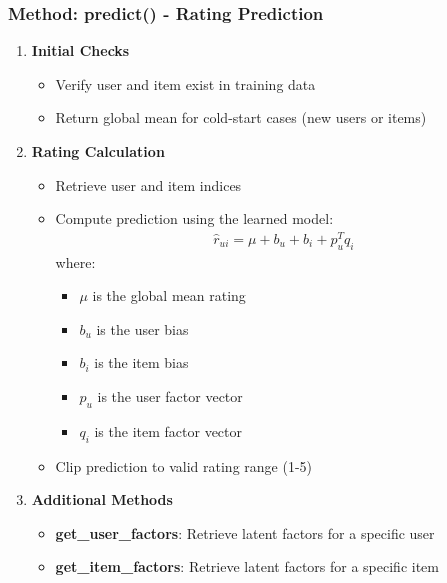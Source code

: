 \documentclass{beamer}
\begin{document}
\begin{frame}
\frametitle{Method: predict() - Rating Prediction}

\begin{enumerate}
    \item \textbf{Initial Checks}
    \begin{itemize}
        \item Verify user and item exist in training data
        \item Return global mean for cold-start cases (new users or items)
    \end{itemize}
    
    \item \textbf{Rating Calculation}
    \begin{itemize}
        \item Retrieve user and item indices
        \item Compute prediction using the learned model:
        \begin{align*}
        \hat{r}_{ui} = \mu + b_u + b_i + p_u^T q_i
        \end{align*}
        where:
        \begin{itemize}
            \item $\mu$ is the global mean rating
            \item $b_u$ is the user bias
            \item $b_i$ is the item bias
            \item $p_u$ is the user factor vector
            \item $q_i$ is the item factor vector
        \end{itemize}
        \item Clip prediction to valid rating range (1-5)
    \end{itemize}
    
    \item \textbf{Additional Methods}
    \begin{itemize}
        \item \textbf{get\_user\_factors}: Retrieve latent factors for a specific user
        \item \textbf{get\_item\_factors}: Retrieve latent factors for a specific item
    \end{itemize}
\end{enumerate}
\end{frame}
\end{document}
